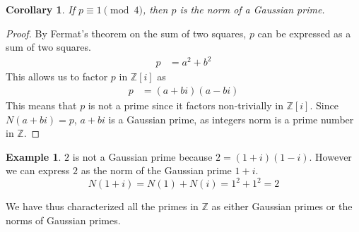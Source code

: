 \documentclass{article}
\theoremstyle{plain} %
\newtheorem{corollary}[theorem]{Corollary}
\theoremstyle{definition} %
\newtheorem{example}[theorem]{Example}
\begin{document}
\begin{corollary}
    If $p \equiv 1 \pmod{4}$, then $p$ is the norm of a Gaussian prime.
\end{corollary}
\begin{proof}
    By Fermat's theorem on the sum of two squares, $p$ can be expressed as a sum of two squares.
    \begin{align*}
        p &= a^2 + b^2
    \end{align*}
    This allows us to factor $p$ in $\mathbb{Z}[i]$ as
    \begin{align*}
        p &= (a + bi)(a - bi)
    \end{align*}
    This means that $p$ is not a prime since it factors non-trivially in $\mathbb{Z}[i]$.
    Since $N(a + bi) = p$, $a + bi$ is a Gaussian prime, as integers
    norm is a prime number in $\mathbb{Z}$.

\end{proof}


\begin{example}
    $2$ is not a Gaussian prime because $2 = (1 + i)(1 - i)$.
    However we can express $2$ as the norm of the Gaussian prime $1 + i$.
    \[
        N(1 + i) = N(1) + N(i) = 1^2 + 1^2 = 2
    \]
\end{example}

We have thus characterized all the primes in $\mathbb{Z}$ as either Gaussian primes or the norms of Gaussian primes.
\end{document}
